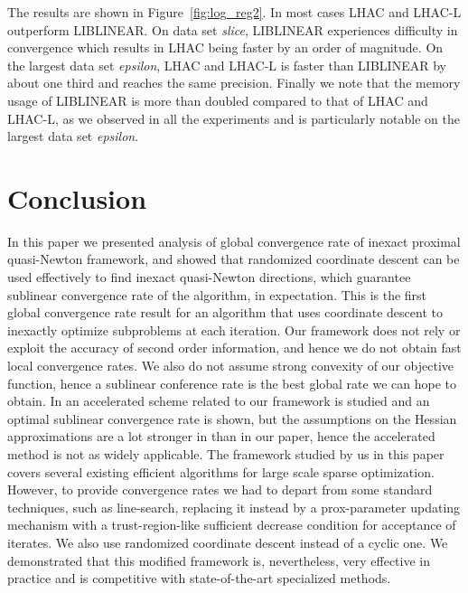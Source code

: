 \documentclass[11pt]{article}
\numberwithin{equation}{section}
\begin{document}
The results are shown in Figure~\ref{fig:log_reg2}. In most cases LHAC and LHAC-L outperform LIBLINEAR. 
On data set \emph{slice}, LIBLINEAR experiences difficulty in convergence which results in LHAC being faster by an order of magnitude.  
On the largest data set \emph{epsilon}, LHAC and LHAC-L is faster than LIBLINEAR by about one third and reaches the same precision. Finally we note that the memory usage of LIBLINEAR is more than doubled compared to that of LHAC and LHAC-L, as we observed in all the experiments and is particularly notable on  the largest data set \emph{epsilon}.



\section{Conclusion} In this paper we presented analysis of global convergence rate of inexact proximal quasi-Newton framework, and showed that randomized coordinate descent can be used effectively to find inexact quasi-Newton directions, which guarantee sublinear convergence rate of the algorithm, in expectation. This is the first global convergence rate result for an algorithm that uses coordinate descent to inexactly optimize subproblems at each iteration. Our framework does not rely or exploit the accuracy of second order information, and hence we do not obtain fast local convergence rates. We also do not assume strong convexity of our objective function, hence a sublinear conference rate is  the best global rate we can hope to obtain. In \cite{Jiangetal2012} an accelerated scheme related to our framework is studied and an optimal sublinear convergence rate is shown, but  the assumptions on the Hessian approximations are a lot stronger in  \cite{Jiangetal2012} than in our paper, hence the accelerated method is not as widely applicable. The framework studied by us in this paper covers several existing efficient algorithms for large scale sparse optimization. However, to provide convergence rates we had to depart from some standard techniques, such as line-search, replacing it instead by a prox-parameter updating mechanism with a trust-region-like sufficient decrease condition for acceptance of iterates. We also use randomized coordinate descent instead of a cyclic one. We demonstrated  that this modified framework is,  nevertheless, very effective in practice and is competitive with state-of-the-art specialized methods.


% 

\end{document}
